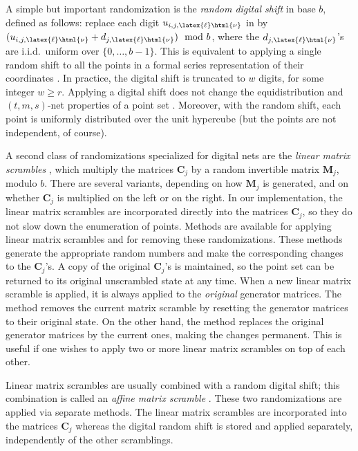 A simple but important randomization is the \emph{random digital shift}
in base $b$, defined as follows: replace each digit $u_{i,j,\latex{\ell}\html{\nu}}$ in 
\latex{(\ref{eq:digital-uij})} by $(u_{i,j,\latex{\ell}\html{\nu}} + d_{j,\latex{\ell}\html{\nu}}) \mod b$,
where the $d_{j,\latex{\ell}\html{\nu}}$'s are i.i.d.\ uniform over $\{0,\dots,b-1\}$.
This is equivalent to applying a single random shift to all the points
in a formal series representation of their coordinates \cite{vLEC02a,vLEM03a}.
In practice, the digital shift is truncated to $w$ digits,
for some integer $w\ge r$.
Applying a digital shift does not change the equidistribution
and $(t,m,s)$-net properties of a point set \cite{vHON03a,vLEC99a,vLEM03a}.
Moreover, with the random shift, each point is uniformly distributed over
the unit hypercube (but the points are not independent, of course).

A second class of randomizations specialized for digital nets
are the \emph{linear matrix scrambles}
\cite{mMAT99a,rFAU02a,vHON03a,vOWE03a}, which multiply the matrices
 $\mathbf{C}_j$
by a random invertible matrix $\mathbf{M}_j$, modulo $b$.
There are several variants, depending on how $\mathbf{M}_j$ is generated, and on
whether $\mathbf{C}_j$ is multiplied on the left or on the right.
In our implementation, the linear matrix scrambles are incorporated directly
into the matrices $\mathbf{C}_j$, so they
 do not slow down  the enumeration of points.
Methods are available for applying
linear matrix scrambles and for removing these randomizations.
These methods generate the appropriate random numbers and make
the corresponding changes to the $\mathbf{C}_j$'s.
A copy of the original $\mathbf{C}_j$'s is maintained, so the point
set can be returned to its original unscrambled state at any time.
When a new linear matrix scramble is applied, it is always applied to
the \emph{original} generator matrices.
The method  removes the current matrix
scramble by resetting the generator matrices to their original state.
On the other hand, the method 
replaces the original generator matrices by the current
ones, making the changes permanent.
This is useful if one wishes to apply two or more linear matrix
scrambles on top of each other.

Linear matrix scrambles are usually combined with a random digital shift;
this combination is called an \emph{affine matrix scramble} \cite{vOWE03a}.
These two randomizations are applied via separate methods.
The linear matrix scrambles are incorporated into the matrices $\mathbf{C}_j$
whereas the digital random shift is stored and applied separately,
independently of the other scramblings.

